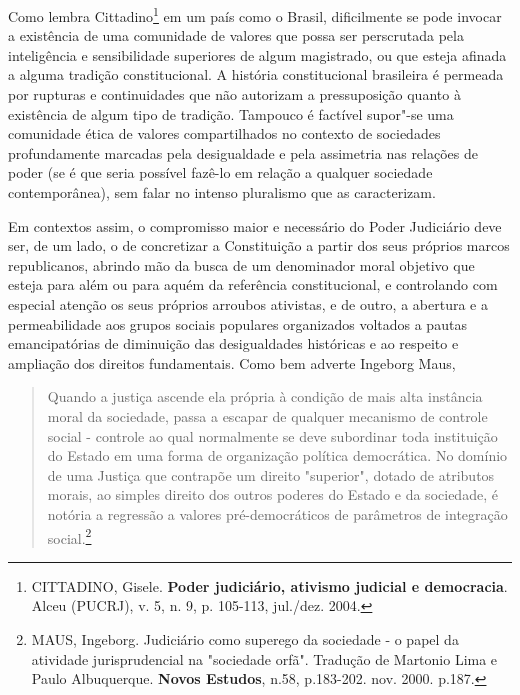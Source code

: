 Como lembra Cittadino\footnote{CITTADINO, Gisele. \textbf{Poder
  judiciário, ativismo judicial e democracia}. Alceu (PUCRJ), v. 5, n.
  9, p. 105-113, jul./dez. 2004.} em um país como o Brasil, dificilmente
se pode invocar a existência de uma comunidade de valores que possa ser
perscrutada pela inteligência e sensibilidade superiores de algum
magistrado, ou que esteja afinada a alguma tradição constitucional. A
história constitucional brasileira é permeada por rupturas e
continuidades que não autorizam a pressuposição quanto à existência de
algum tipo de tradição. Tampouco é factível supor"-se uma comunidade
ética de valores compartilhados no contexto de sociedades profundamente
marcadas pela desigualdade e pela assimetria nas relações de poder (se é
que seria possível fazê-lo em relação a qualquer sociedade
contemporânea), sem falar no intenso pluralismo que as caracterizam.

Em contextos assim, o compromisso maior e necessário do Poder Judiciário
deve ser, de um lado, o de concretizar a Constituição a partir dos seus
próprios marcos republicanos, abrindo mão da busca de um denominador
moral objetivo que esteja para além ou para aquém da referência
constitucional, e controlando com especial atenção os seus próprios
arroubos ativistas, e de outro, a abertura e a permeabilidade aos grupos
sociais populares organizados voltados a pautas emancipatórias de
diminuição das desigualdades históricas e ao respeito e ampliação dos
direitos fundamentais. Como bem adverte Ingeborg Maus,

\begin{quote}
Quando a justiça ascende ela própria à condição de mais alta instância
moral da sociedade, passa a escapar de qualquer mecanismo de controle
social - controle ao qual normalmente se deve subordinar toda
instituição do Estado em uma forma de organização política democrática.
No domínio de uma Justiça que contrapõe um direito "superior", dotado de
atributos morais, ao simples direito dos outros poderes do Estado e da
sociedade, é notória a regressão a valores pré-democráticos de
parâmetros de integração social.\footnote{MAUS, Ingeborg. Judiciário
  como superego da sociedade - o papel da atividade jurisprudencial na
  "sociedade orfã". Tradução de Martonio Lima e Paulo Albuquerque.
  \textbf{Novos Estudos}, n.58, p.183-202. nov. 2000. p.187.}
\end{quote}

